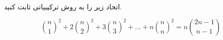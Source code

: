 \exercise
اتحاد زیر را به روش ترکیبیاتی ثابت کنید.

$$\binom{n}{1}^2 + 2\binom{n}{2}^2 + 3\binom{n}{3}^2 + ... + n\binom{n}{n}^2 = n\binom{2n-1}{n-1}$$